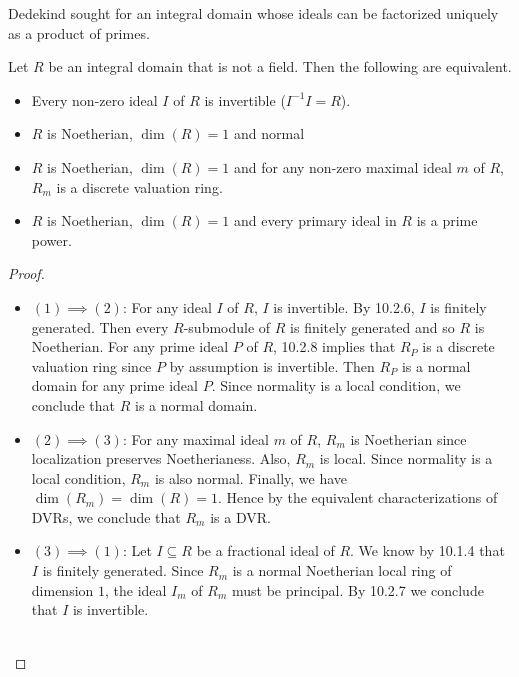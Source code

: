 \documentclass[a4paper]{article}
\begin{document}
Dedekind sought for an integral domain whose ideals can be factorized uniquely as a product of primes. 

\begin{prp}{}{} Let $R$ be an integral domain that is not a field. Then the following are equivalent. 
\begin{itemize}
\item Every non-zero ideal $I$ of $R$ is invertible ($I^{-1}I=R$). 
\item $R$ is Noetherian, $\dim(R)=1$ and normal
\item $R$ is Noetherian, $\dim(R)=1$ and for any non-zero maximal ideal $m$ of $R$, $R_m$ is a discrete valuation ring. 
\item $R$ is Noetherian, $\dim(R)=1$ and every primary ideal in $R$ is a prime power. 
\end{itemize} \tcbline
\begin{proof}~\\
\begin{itemize}
\item $(1)\implies(2)$: For any ideal $I$ of $R$, $I$ is invertible. By 10.2.6, $I$ is finitely generated. Then every $R$-submodule of $R$ is finitely generated and so $R$ is Noetherian. For any prime ideal $P$ of $R$, 10.2.8 implies that $R_P$ is a discrete valuation ring since $P$ by assumption is invertible. Then $R_P$ is a normal domain for any prime ideal $P$. Since normality is a local condition, we conclude that $R$ is a normal domain. 

\item $(2)\implies(3)$: For any maximal ideal $m$ of $R$, $R_m$ is Noetherian since localization preserves Noetherianess. Also, $R_m$ is local. Since normality is a local condition, $R_m$ is also normal. Finally, we have $\dim(R_m)=\dim(R)=1$. Hence by the equivalent characterizations of DVRs, we conclude that $R_m$ is a DVR. 

\item $(3)\implies(1)$: Let $I\subseteq R$ be a fractional ideal of $R$. We know by 10.1.4 that $I$ is finitely generated. Since $R_m$ is a normal Noetherian local ring of dimension $1$, the ideal $I_m$ of $R_m$ must be principal. By 10.2.7 we conclude that $I$ is invertible. \\~\\

\end{itemize}
\end{proof}
\end{prp}
\end{document}
